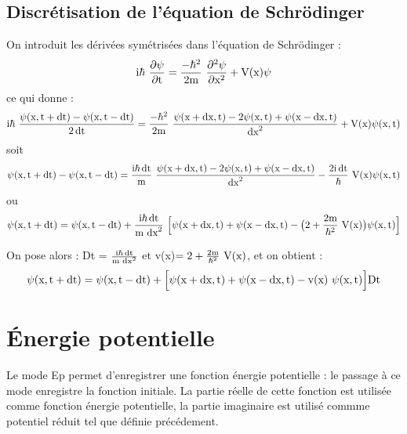 \subsection{Discrétisation de l'équation de Schrödinger}
%
On introduit les dérivées symétrisées dans l'équation de Schrödinger :
\[
\mt{i}\hbar\ \frac{\partial\psi}{\partial\mt{t}} =
\frac{-\hbar^2}{2\mt{m}}\ \frac{\partial^2\psi}{\partial\mt{x}^2}
+\mt{V(x)}\psi
\]
%
ce qui donne :
\[
\mt{i}\hbar\ \frac{\psi(\mt{x},\mt{t}+\dt)-\psi(\mt{x},\mt{t}-\dt)}{2\dt} =
\frac{-\hbar^2}{2\mt{m}}\ \frac{\psi(\mt{x}+\mt{dx},\mt{t})-2\psi(\mt{x},\mt{t})+\psi(\mt{x}-\mt{dx},\mt{t})}{\mt{dx}^2}
+\mt{V(x)}\psi(\mt{x},\mt{t})
\]
%
soit
\[
\psi(\mt{x},\mt{t}+\dt)-\psi(\mt{x},\mt{t}-\dt)=
\frac{\mt{i}\hbar\dt}{\mt{m}}\ \frac{\psi(\mt{x}+\mt{dx},\mt{t})-2\psi(\mt{x},\mt{t})+\psi(\mt{x}-\mt{dx},\mt{t})}{\mt{dx}^2}
-\frac{2\mt{i}\dt}{\hbar}\ \mt{V(x)}\psi(\mt{x},\mt{t})
\]
ou
\[
\psi(\mt{x},\mt{t}+\dt)=\psi(\mt{x},\mt{t}-\dt)+
\frac{\mt{i}\hbar\dt}{\mt{m }\mt{dx}^2}\ \Big[\psi(\mt{x}+\mt{dx},\mt{t})+\psi(\mt{x}-\mt{dx},\mt{t})
-\big(2+\frac{2\mt{m}}{\hbar^2}\ \mt{V(x)}\big)\psi(\mt{x},\mt{t})\Big]
\]

On pose alors : Dt = $\frac{\text{i}\hbar\operatorname{dt}}{\text{m }\text{dx}^2}$ et v(x)$=2+\frac{2\mt{m}}{\hbar^2}\ \mt{V(x)}$, et on obtient :
\[
\psi(\text{x},\text{t}+\operatorname{dt})=\psi(\text{x},\text{t}-\operatorname{dt})+
\Big[\psi(\text{x}+\text{dx},\text{t})+\psi(\text{x}-\text{dx},\text{t})
-\text{v(x) }\psi(\text{x},\text{t})\Big]\text{Dt}
\]

\section{Énergie potentielle} %
%
Le mode Ep permet d'enregistrer une fonction énergie potentielle : le passage à ce mode enregistre la fonction initiale. La partie réelle de cette fonction est utilisée comme fonction énergie potentielle, la partie imaginaire est utilisé commme potentiel réduit tel que définie précédement.
%

